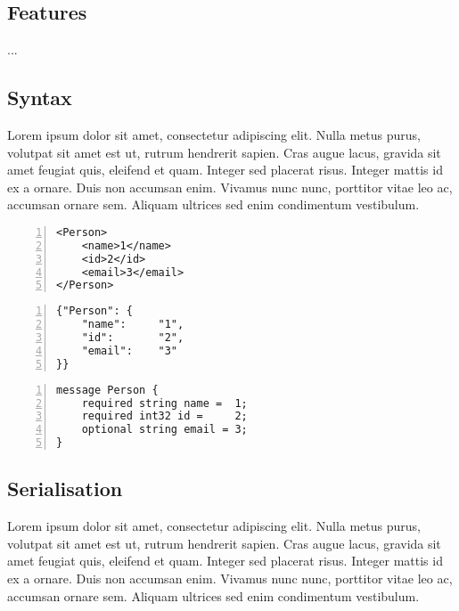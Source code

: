\documentclass[../report.tex]{subfiles}
\begin{document}
\subsection{Features}

...

\subsection{Syntax}

Lorem ipsum dolor sit amet, consectetur adipiscing elit. Nulla metus purus, volutpat sit amet est ut, rutrum hendrerit sapien. Cras augue lacus, gravida sit amet feugiat quis, eleifend et quam. Integer sed placerat risus. Integer mattis id ex a ornare. Duis non accumsan enim. Vivamus nunc nunc, porttitor vitae leo ac, accumsan ornare sem. Aliquam ultrices sed enim condimentum vestibulum. \\

\begin{Verbatim}[frame=single,numbers=left,framesep=5mm,label=XML Object]
<Person>
    <name>1</name>
    <id>2</id>
    <email>3</email>
</Person>
\end{Verbatim}

\vspace{1mm}

\begin{Verbatim}[frame=single,numbers=left,framesep=5mm,label=JSON Object]
{"Person": {
    "name":     "1",
    "id":       "2",
    "email":    "3"
}}
\end{Verbatim}

\vspace{1mm}

\begin{Verbatim}[frame=single,numbers=left,framesep=5mm,label=Proto Object]
message Person {
    required string name =  1;
    required int32 id =     2;
    optional string email = 3;
}
\end{Verbatim}

\subsection{Serialisation}

Lorem ipsum dolor sit amet, consectetur adipiscing elit. Nulla metus purus, volutpat sit amet est ut, rutrum hendrerit sapien. Cras augue lacus, gravida sit amet feugiat quis, eleifend et quam. Integer sed placerat risus. Integer mattis id ex a ornare. Duis non accumsan enim. Vivamus nunc nunc, porttitor vitae leo ac, accumsan ornare sem. Aliquam ultrices sed enim condimentum vestibulum.
\end{document}
